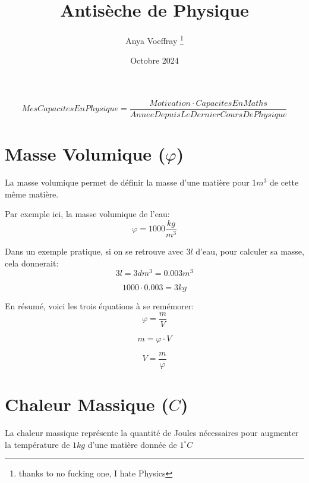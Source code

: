 \documentclass{article}
\title{Antisèche de Physique}
\author{Anya Voeffray \thanks{thanks to no fucking one, I hate Physics}}
\date{Octobre 2024}
\begin{document}
\begin{titlepage}
\maketitle
\begin{equation}
	Mes Capacites En Physique =  \frac{Motivation \cdot Capacites En Maths}{Annee Depuis Le Dernier Cours De Physique}
\end{equation}


\end{titlepage}

\section{Masse Volumique ($\varphi$)}

La masse volumique permet de définir la masse d'une matière pour $1m^3$ de cette même matière.

Par exemple ici, la masse volumique de l'eau:
\begin{equation}
	\varphi = 1000 \frac{kg}{m^3}
\end{equation}

Dans un exemple pratique, si on se retrouve avec $3l$ d'eau, pour calculer sa masse, cela donnerait:
	\begin{equation}
		3l = 3dm^3 = 0.003m^3
	\end{equation}
	
	\begin{equation}
		1000 \cdot 0.003 = 3kg
	\end{equation}

En résumé, voici les trois équations à se remémorer:
\begin{equation}
	\varphi = \frac{m}{V}
\end{equation}

\begin{equation}
	m = \varphi \cdot V
\end{equation}

\begin{equation}
	V = \frac{m}{\varphi}
\end{equation}

\pagebreak

\section{Chaleur Massique ($C$)}

La chaleur massique représente la quantité de Joules nécessaires pour augmenter la température de $1kg$ d'une matière donnée de $1 ^\circ C$
\end{document}
